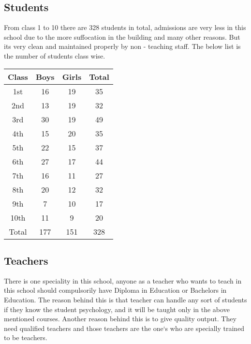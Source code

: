 \subsection{Students}
From class 1 to 10 there are 328 students in total, admissions are very less in this school due to the more suffocation in the building and many other reasons. But its very clean and maintained properly by non - teaching staff. The below list is the number of students class wise.
\begin{table}[H]
    \centering
    \begin{tabular}{c|c|c|c} \toprule \bottomrule 
         Class & Boys & Girls & Total   \\ \toprule \bottomrule  
         1st & 16 & 19 & 35 \\ \hline 
         2nd & 13 & 19 & 32 \\ \hline 
         3rd & 30 & 19 & 49 \\ \hline 
         4th & 15 & 20 & 35 \\ \hline 
         5th & 22 & 15 & 37 \\ \hline 
         6th & 27 & 17 & 44 \\ \hline 
         7th & 16 & 11 & 27 \\ \hline 
         8th & 20 & 12 & 32 \\ \hline 
         9th & 7 & 10 & 17 \\ \hline 
         10th & 11 & 9 & 20 \\ \hline 
         Total & 177 & 151 & 328 \\ \toprule \bottomrule 
    \end{tabular}
\end{table}

\subsection{Teachers}
There is one speciality in this school, anyone as a teacher who wants to teach in this school should compulsorily have Diploma in Education or Bachelors in Education. The reason behind this is that teacher can handle any sort of students if they know the student psychology, and it will be taught only in the above mentioned courses. Another reason behind this is to give quality output. They need qualified teachers and those teachers are the one`s who are specially trained to be teachers.\\


